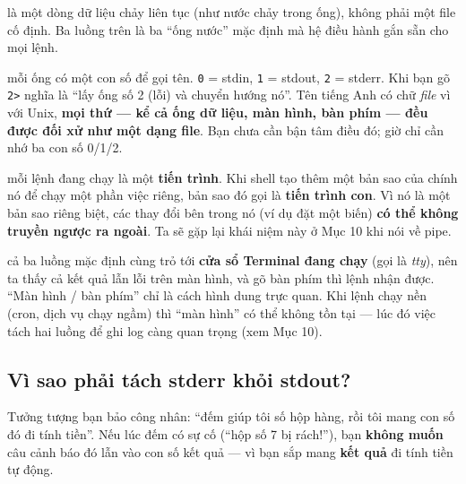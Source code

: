 \documentclass[12pt,a4paper]{article}
\newcommand{\cmd}[1]{\texttt{#1}}
\begin{document}
\begin{notebox}[title={Định nghĩa nhanh --- ``luồng'' (stream)}]
là một dòng dữ liệu chảy liên tục (như nước chảy trong ống), không phải một file cố định. Ba luồng trên là ba ``ống nước'' mặc định mà hệ điều hành gắn sẵn cho mọi lệnh.
\end{notebox}

\begin{notebox}[title={Định nghĩa nhanh --- ``số hiệu'' (file descriptor)}]
mỗi ống có một con số để gọi tên. \cmd{0} = stdin, \cmd{1} = stdout, \cmd{2} = stderr. Khi bạn gõ \cmd{2>} nghĩa là ``lấy ống số 2 (lỗi) và chuyển hướng nó''. Tên tiếng Anh có chữ \textit{file} vì với Unix, \textbf{mọi thứ --- kể cả ống dữ liệu, màn hình, bàn phím --- đều được đối xử như một dạng file}. Bạn chưa cần bận tâm điều đó; giờ chỉ cần nhớ ba con số 0/1/2.
\end{notebox}

\begin{notebox}[title={Định nghĩa nhanh --- ``tiến trình'' và ``tiến trình con'' (process / subprocess)}]
mỗi lệnh đang chạy là một \textbf{tiến trình}. Khi shell tạo thêm một bản sao của chính nó để chạy một phần việc riêng, bản sao đó gọi là \textbf{tiến trình con}. Vì nó là một bản sao riêng biệt, các thay đổi bên trong nó (ví dụ đặt một biến) \textbf{có thể không truyền ngược ra ngoài}. Ta sẽ gặp lại khái niệm này ở Mục 10 khi nói về pipe.
\end{notebox}

\begin{notebox}[title={Chính xác hơn (không bắt buộc nhớ)}]
cả ba luồng mặc định cùng trỏ tới \textbf{cửa sổ Terminal đang chạy} (gọi là \textit{tty}), nên ta thấy cả kết quả lẫn lỗi trên màn hình, và gõ bàn phím thì lệnh nhận được. ``Màn hình / bàn phím'' chỉ là cách hình dung trực quan. Khi lệnh chạy nền (cron, dịch vụ chạy ngầm) thì ``màn hình'' có thể không tồn tại --- lúc đó việc tách hai luồng để ghi log càng quan trọng (xem Mục 10).
\end{notebox}

\subsection{Vì sao phải tách stderr khỏi stdout?}

Tưởng tượng bạn bảo công nhân: ``đếm giúp tôi số hộp hàng, rồi tôi mang con số đó đi tính tiền''. Nếu lúc đếm có sự cố (``hộp số 7 bị rách!''), bạn \textbf{không muốn} câu cảnh báo đó lẫn vào con số kết quả --- vì bạn sắp mang \textbf{kết quả} đi tính tiền tự động.
\end{document}

